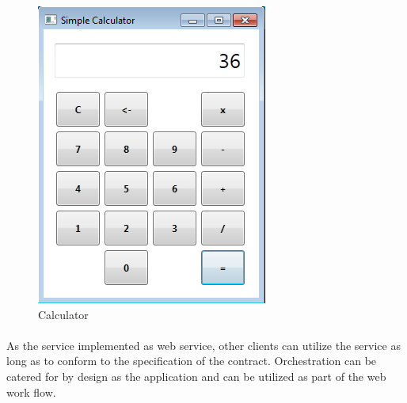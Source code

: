 		\begin{figure}[h!]
			\centering
			\includegraphics[scale=0.5]{figures/calc.png}
			\caption{Calculator}
		\end{figure}

		\vspace{5mm}
	    \begin{multicols}{2}
		\paragraph{}
		
		As the service implemented as web service, other clients can utilize the service as long as to conform to the specification of the contract.
		Orchestration can be catered for by design as the application and can be utilized as part of the web work flow.
		 
		
		\end{multicols}